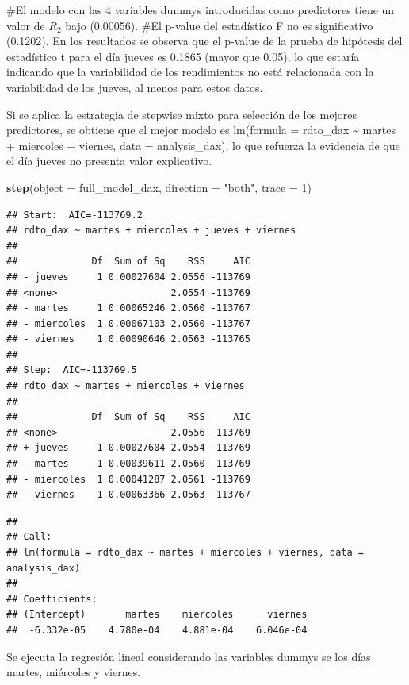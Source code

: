 \documentclass[
  11pt,
]{article}
\newenvironment{Shaded}{\begin{snugshade}}{\end{snugshade}}
\newcommand{\DataTypeTok}[1]{\textcolor[rgb]{0.13,0.29,0.53}{#1}}
\newcommand{\DecValTok}[1]{\textcolor[rgb]{0.00,0.00,0.81}{#1}}
\newcommand{\KeywordTok}[1]{\textcolor[rgb]{0.13,0.29,0.53}{\textbf{#1}}}
\newcommand{\NormalTok}[1]{#1}
\newcommand{\StringTok}[1]{\textcolor[rgb]{0.31,0.60,0.02}{#1}}
\begin{document}
\#El modelo con las 4 variables dummys introducidas como predictores
tiene un valor de \(R_2\) bajo (0.00056). \#El p-value del estadístico F
no es significativo (0.1202). En los resultados se observa que el
p-value de la prueba de hipótesis del estadístico t para el día jueves
es 0.1865 (mayor que 0.05), lo que estaría indicando que la variabilidad
de los rendimientos no está relacionada con la variabilidad de los
jueves, al menos para estos datos.

Si se aplica la estrategia de stepwise mixto para selección de los
mejores predictores, se obtiene que el mejor modelo es lm(formula =
rdto\_dax \textasciitilde{} martes + miercoles + viernes, data =
analysis\_dax), lo que refuerza la evidencia de que el día jueves no
presenta valor explicativo.

\begin{Shaded}
\begin{Highlighting}[]
\KeywordTok{step}\NormalTok{(}\DataTypeTok{object =}\NormalTok{ full_model_dax, }\DataTypeTok{direction =} \StringTok{"both"}\NormalTok{, }\DataTypeTok{trace =} \DecValTok{1}\NormalTok{)}
\end{Highlighting}
\end{Shaded}

\begin{verbatim}
## Start:  AIC=-113769.2
## rdto_dax ~ martes + miercoles + jueves + viernes
## 
##             Df  Sum of Sq    RSS     AIC
## - jueves     1 0.00027604 2.0556 -113769
## <none>                    2.0554 -113769
## - martes     1 0.00065246 2.0560 -113767
## - miercoles  1 0.00067103 2.0560 -113767
## - viernes    1 0.00090646 2.0563 -113765
## 
## Step:  AIC=-113769.5
## rdto_dax ~ martes + miercoles + viernes
## 
##             Df  Sum of Sq    RSS     AIC
## <none>                    2.0556 -113769
## + jueves     1 0.00027604 2.0554 -113769
## - martes     1 0.00039611 2.0560 -113769
## - miercoles  1 0.00041287 2.0561 -113769
## - viernes    1 0.00063366 2.0563 -113767
\end{verbatim}

\begin{verbatim}
## 
## Call:
## lm(formula = rdto_dax ~ martes + miercoles + viernes, data = analysis_dax)
## 
## Coefficients:
## (Intercept)       martes    miercoles      viernes  
##  -6.332e-05    4.780e-04    4.881e-04    6.046e-04
\end{verbatim}

Se ejecuta la regresión lineal considerando las variables dummys se los
días martes, miércoles y viernes.
\end{document}

